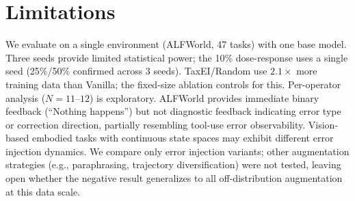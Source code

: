 \section*{Limitations}

We evaluate on a single environment (ALFWorld, 47 tasks) with one base model. Three seeds provide limited statistical power; the 10\% dose-response uses a single seed (25\%/50\% confirmed across 3 seeds). TaxEI/Random use $2.1\times$ more training data than Vanilla; the fixed-size ablation controls for this. Per-operator analysis ($N{=}11$--$12$) is exploratory. ALFWorld provides immediate binary feedback (``Nothing happens'') but not diagnostic feedback indicating error type or correction direction, partially resembling tool-use error observability. Vision-based embodied tasks with continuous state spaces may exhibit different error injection dynamics. We compare only error injection variants; other augmentation strategies (e.g., paraphrasing, trajectory diversification) were not tested, leaving open whether the negative result generalizes to all off-distribution augmentation at this data scale.
